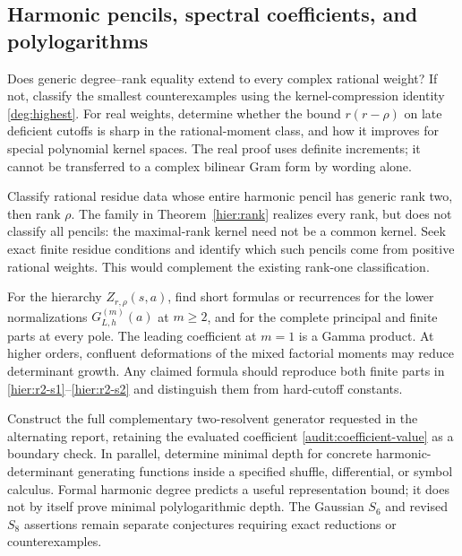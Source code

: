 \subsection{Harmonic pencils, spectral coefficients, and polylogarithms}

\begin{question}
Does generic degree--rank equality extend to every complex rational
weight? If not, classify the smallest counterexamples using the
kernel-compression identity \eqref{deg:highest}. For real weights,
determine whether the bound $r(r-\rho)$ on late deficient cutoffs is
sharp in the rational-moment class, and how it improves for special
polynomial kernel spaces. The real proof uses definite increments;
it cannot be transferred to a complex bilinear Gram form by wording
alone.
\end{question}

\begin{question}
Classify rational residue data whose entire harmonic pencil has
generic rank two, then rank $\rho$. The family in
Theorem~\ref{hier:rank} realizes every rank, but does not classify all
pencils: the maximal-rank kernel need not be a common kernel.
Seek exact finite residue conditions and identify which such pencils
come from positive rational weights. This would complement the
existing rank-one classification.
\end{question}

\begin{question}
For the hierarchy $Z_{r,\rho}(s,a)$, find short formulas or recurrences
for the lower normalizations $G_{L,h}^{(m)}(a)$ at $m\ge2$, and for
the complete principal and finite parts at every pole. The leading
coefficient at $m=1$ is a Gamma product. At higher orders, confluent
deformations of the mixed factorial moments may reduce determinant
growth. Any claimed formula should reproduce both finite parts in
\eqref{hier:r2-s1}--\eqref{hier:r2-s2} and distinguish them from
hard-cutoff constants.
\end{question}

\begin{question}
Construct the full complementary two-resolvent generator requested
in the alternating report, retaining the evaluated coefficient
\eqref{audit:coefficient-value} as a boundary check. In parallel,
determine minimal depth for concrete harmonic-determinant generating
functions inside a specified shuffle, differential, or symbol
calculus. Formal harmonic degree predicts a useful representation
bound; it does not by itself prove minimal polylogarithmic depth.
The Gaussian $S_6$ and revised $S_8$ assertions remain separate
conjectures requiring exact reductions or counterexamples.
\end{question}

